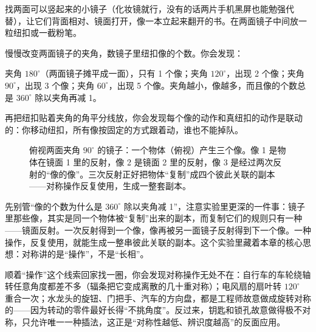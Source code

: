 \begin{experiment}[两面镜子的万花筒]
找两面可以竖起来的小镜子（化妆镜就行，没有的话两片手机黑屏也能勉强代替），让它们背面相对、镜面打开，像一本立起来翻开的书。在两面镜子中间放一粒纽扣或一截粉笔。

慢慢改变两面镜子的夹角，数镜子里纽扣像的个数。你会发现：

夹角 \(180^\circ\)（两面镜子摊平成一面），只有 1 个像；夹角 \(120^\circ\)，出现 2 个像；夹角 \(90^\circ\)，出现 3 个像；夹角 \(60^\circ\)，出现 5 个像。夹角越小，像越多，而且像的个数总是 \(360^\circ\) 除以夹角再减 1。

再把纽扣贴着夹角的角平分线放，你会发现每个像的动作和真纽扣的动作是联动的：你移动纽扣，所有像按固定的方式跟着动，谁也不能掉队。
\end{experiment}

\begin{figure}[htbp]
\centering
{}
\caption{俯视两面夹角 \(90^\circ\) 的镜子：一个物体（俯视）产生三个像。像 1 是物体在镜面 1 里的反射，像 2 是镜面 2 里的反射，像 3 是经过两次反射的“像的像”。三次反射正好把物体“复制”成四个彼此关联的副本——对称操作反复使用，生成一整套副本。}
\end{figure}

先别管“像的个数为什么是 \(360^\circ\) 除以夹角减 1”，注意实验里更深的一件事：镜子里那些像，其实是同一个物体被“复制”出来的副本，而复制它们的规则只有一种——镜面反射。一次反射得到一个像，像再被另一面镜子反射得到下一个像。一种操作，反复使用，就能生成一整串彼此关联的副本。这个实验里藏着本章的核心思想：对称讲的是“操作”，不是“长相”。

顺着“操作”这个线索回家找一圈，你会发现对称操作无处不在：自行车的车轮绕轴转任意角度都差不多（辐条把它变成离散的几十重对称）；电风扇的扇叶转 \(120^\circ\) 重合一次；水龙头的旋钮、门把手、汽车的方向盘，都是工程师故意做成旋转对称的——因为转动的零件最好长得“不挑角度”。反过来，钥匙和锁孔故意做得极不对称，只允许唯一一种插法，这正是“对称性越低、辨识度越高”的反面应用。

